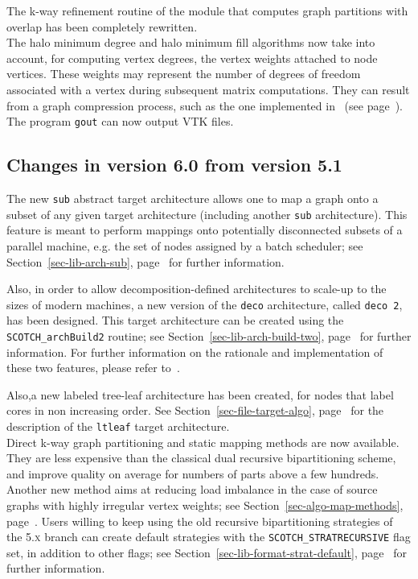 The k-way refinement routine of the module that computes graph
partitions with overlap has been completely rewritten.
\\

The halo minimum degree and halo minimum fill algorithms now take into
account, for computing vertex degrees, the vertex weights attached to
node vertices. These weights may represent the number of degrees of
freedom associated with a vertex during subsequent matrix
computations. They can result from a graph compression process, such
as the one implemented in \scotch\ (see
page~\pageref{sec-lib-meth-compress}).
\\

The program \texttt{gout} can now output VTK files.

\subsection{Changes in version 6.0 from version 5.1}

The new \texttt{sub} abstract target architecture allows one to map a
graph onto a subset of any given target architecture (including
another \texttt{sub} architecture). This feature is meant to perform
mappings onto potentially disconnected subsets of a parallel machine,
e.g. the set of nodes assigned by a batch scheduler; see
Section~\ref{sec-lib-arch-sub}, page~\pageref{sec-lib-arch-sub} for
further information.

Also, in order to allow decomposition-defined architectures to
scale-up to the sizes of modern machines, a new version of the
\texttt{deco} architecture, called \texttt{deco~2}, has been
designed. This target architecture can be created using the
\texttt{SCOTCH\_\lbt arch\lbt Build2} routine; see
Section~\ref{sec-lib-arch-build-two},
page~\pageref{sec-lib-arch-build-two} for further information.
For further information on the rationale and implementation of these
two features, please refer to~\cite{pellegrini:hal-01671156}.

Also,a new labeled tree-leaf architecture has been created, for nodes
that label cores in non increasing order. See
Section~\ref{sec-file-target-algo},
page~\pageref{sec-file-target-algo} for the description of the
\texttt{ltleaf} target architecture.
\\

Direct k-way graph partitioning and static mapping methods are now
available. They are less expensive than the classical dual recursive
bipartitioning scheme, and improve quality on average for numbers of
parts above a few hundreds. Another new method aims at reducing load
imbalance in the case of source graphs with highly irregular vertex
weights; see Section~\ref{sec-algo-map-methods},
page~\pageref{sec-algo-map-methods}. Users willing to keep using the
old recursive bipartitioning strategies of the \textsc{5.x} branch can
create default strategies with the \texttt{SCOTCH\_\lbt STRATRECURSIVE}
flag set, in addition to other flags; see
Section~\ref{sec-lib-format-strat-default},
page~\pageref{sec-lib-format-strat-default} for further information.
\\

